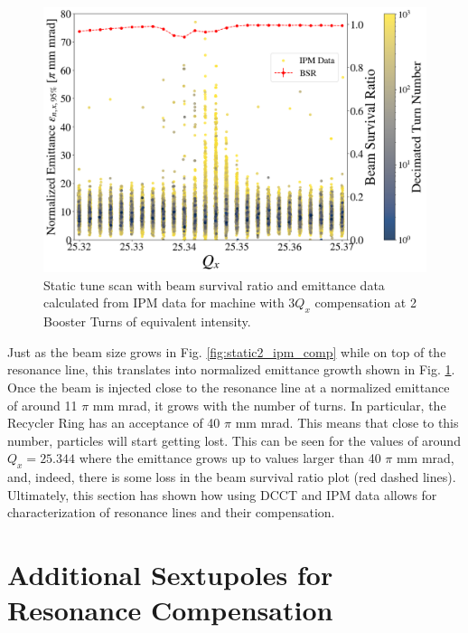 \begin{figure}[H]
    \centering
    \includegraphics[width=\columnwidth]{chapter4/static2turns_emittance_comp.png}
    \caption{Static tune scan with beam survival ratio and emittance data calculated from IPM data for machine with $3Q_x$ compensation at 2 Booster Turns of equivalent intensity.}
    \label{fig:static2_emit_comp}
\end{figure}

Just as the beam size grows in Fig. \ref{fig:static2_ipm_comp} while on top of the resonance line, this translates into normalized emittance growth shown in Fig. \ref{fig:static2_emit_comp}. Once the beam is injected close to the resonance line at a normalized emittance of around 11 $\pi$ mm mrad, it grows with the number of turns. In particular, the Recycler Ring has an acceptance of 40 $\pi$ mm mrad. This means that close to this number, particles will start getting lost. This can be seen for the values of around $Q_x=25.344$ where the emittance grows up to values larger than 40 $\pi$ mm mrad, and, indeed, there is some loss in the beam survival ratio plot (red dashed lines). Ultimately, this section has shown how using DCCT and IPM data allows for characterization of resonance lines and their compensation.

\section{Additional Sextupoles for Resonance Compensation}
\label{sec:addsexts}

